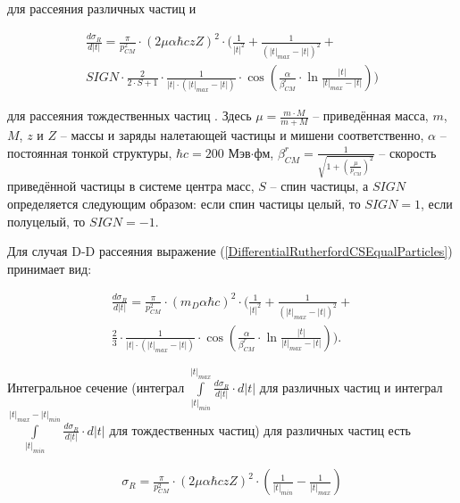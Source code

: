 \documentclass[a4paper,12pt]{article}
\begin{document}
\begin{large}
	для рассеяния различных частиц \cite{LandauLifshitzMechanics} и
	
\begin{equation}
\label{DifferentialRutherfordCSEqualParticles}
\begin{aligned} 
  \frac{d \sigma_R}{d|t|} = \frac{\pi}{p^2_{CM}} \cdot \left( 2 \mu \alpha \hbar c z Z \right)^2 \cdot               \Biggl( \frac{1}{|t|^2} + \frac{1}{\left( |t|_{max} - |t| \right)^2} + \\
  SIGN \cdot \frac{2}{2 \cdot S+1} \cdot
  \frac{1}{|t| \cdot \left( |t|_{max} -|t| \right)}
  \cdot \cos{ \left( \frac{\alpha}{\beta^r_{CM}}
  \cdot \ln{ \frac{|t|}{|t|_{max} -|t|} } \right)}
\Biggr)
\end{aligned}
\end{equation}

	для рассеяния тождественных частиц \cite{LandauLifshitzNonrelativisticQM}.
	Здесь $\mu=\frac{m\cdot M}{m+M}$ -- приведённая масса, $m$, $M$, $z$ и $Z$ -- массы и заряды налетающей частицы и мишени соответственно, $\alpha$ -- постоянная тонкой структуры, $\hbar c=200$ Мэв$\cdot$фм, $\beta^r_{CM}=\frac{1}{\sqrt{1+\left( \frac{\mu}{p_{CM}} \right)^2 }}$ -- скорость приведённой частицы в системе центра масс, $S$ -- спин частицы, а $SIGN$ определяется следующим образом: если спин частицы целый, то $SIGN=1$, если полуцелый, то $SIGN=-1$.
	
	Для случая D-D рассеяния выражение (\ref{DifferentialRutherfordCSEqualParticles}) принимает вид:
	
\begin{equation}
\label{DifferentialRutherfordCSEqualDD}
\begin{aligned} 
  \frac{d \sigma_R}{d|t|} = \frac{\pi}{p^2_{CM}} \cdot \left( m_D \alpha \hbar c \right)^2 \cdot               \Biggl( \frac{1}{|t|^2} + \frac{1}{\left( |t|_{max} - |t| \right)^2} + \\
  \frac{2}{3} \cdot
  \frac{1}{|t| \cdot \left( |t|_{max} -|t| \right)}
  \cdot \cos{ \left( \frac{\alpha}{\beta^r_{CM}}
  \cdot \ln{ \frac{|t|}{|t|_{max} -|t|} } \right)}
\Biggr).
\end{aligned}
\end{equation}

	Интегральное сечение (интеграл $\int \limits_{|t|_{min}}^{|t|_{max}} \frac{d\sigma_R}{d|t|} \cdot d|t|$ для различных частиц и интеграл $\int \limits_{|t|_{min}}^{|t|_{max}-|t|_{min}} \frac{d\sigma_R}{d|t|} \cdot d|t|$ для тождественных частиц) для различных частиц есть

\begin{equation}
\label{IntegralRutherfordCSDifferentParticles}
\begin{aligned} 
  \sigma_R = \frac{\pi}{p^2_{CM}} \cdot \left( 2 \mu \alpha \hbar c z Z \right)^2 \cdot \left( \frac{1}{|t|_{min}} - \frac{1}{|t|_{max}} \right) 
\end{aligned}
\end{equation}


\end{large}
\end{document}
